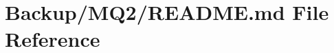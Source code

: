 \hypertarget{_backup_2_m_q2_2_r_e_a_d_m_e_8md}{}\section{Backup/\+M\+Q2/\+R\+E\+A\+D\+ME.md File Reference}
\label{_backup_2_m_q2_2_r_e_a_d_m_e_8md}
